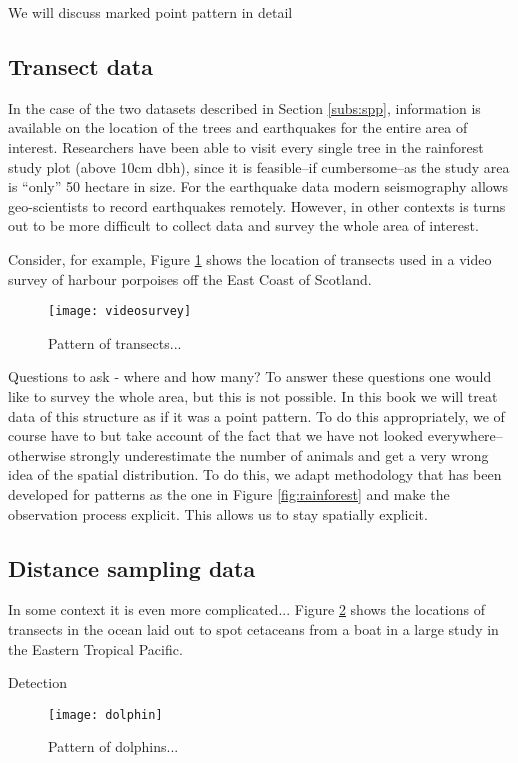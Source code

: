 We will discuss marked point pattern in detail

\subsection{Transect data}
In the case of the two datasets described in Section \ref{subs:spp}, information is available on the location of the trees and earthquakes for the entire area of interest. Researchers have been able to visit every single tree in the rainforest study plot  (above 10cm dbh), since it is feasible--if cumbersome--as the study area is ``only'' 50 hectare  in size. For the earthquake data modern  seismography allows geo-scientists to record earthquakes remotely. However, in other contexts is turns out to be more difficult to collect data and survey the whole area of interest.

Consider, for example, Figure \ref{fig:video} shows the location of transects used in a video survey of harbour porpoises off the East Coast of Scotland. 


\begin{figure}
\begin{center}
\texttt{[image: videosurvey]}
\caption{\label{fig:video} Pattern of transects...}
\end{center}
\end{figure}

Questions to ask - where and how many? To answer these questions one would like to survey the whole area, but this is not possible. 
In this book we will treat data of this structure as if it was a point pattern. To do this appropriately, we of course have to but take account of the  fact that we have not looked everywhere-- otherwise strongly underestimate the number of animals and get a very wrong idea of the spatial distribution. To do this, we adapt methodology that has been developed for patterns as the one in Figure \ref{fig:rainforest} and make the observation process explicit. This allows us to stay spatially explicit.

\subsection{Distance sampling data}
In some context it is even more complicated...
Figure \ref{fig:dolphins} shows the locations of transects in the ocean laid out to spot cetaceans from a boat in a large study in the Eastern Tropical Pacific. 

Detection 
\begin{figure}
\begin{center}
\texttt{[image: dolphin]}
\caption{\label{fig:dolphins} Pattern of dolphins...}
\end{center}
\end{figure}

